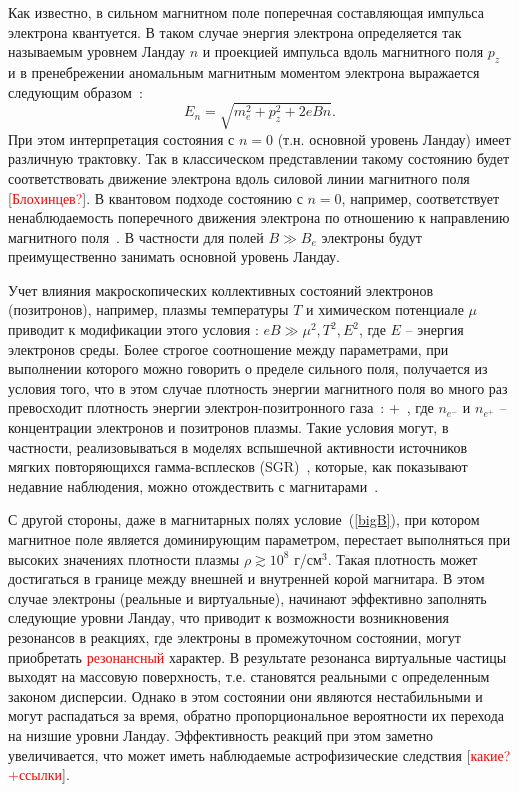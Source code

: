 Как известно, в сильном магнитном поле поперечная составляющая импульса электрона квантуется. В таком случае энергия электрона определяется так называемым уровнем Ландау $n$ и проекцией импульса вдоль магнитного поля $p_z$ и в пренебрежении аномальным магнитным моментом электрона выражается следующим образом~\cite{Sokolov:1968}: 
\begin{equation}
E_n = \sqrt{m_e^2+p_z^2+2 e B n}.
\end{equation}
%
При этом интерпретация состояния с $n=0$ (т.н. основной уровень Ландау) имеет различную трактовку. Так в классическом представлении такому состоянию будет соответствовать движение электрона вдоль силовой линии магнитного поля [\textcolor{red}{Блохинцев?}]. В квантовом подходе состоянию с $n=0$, например, соответствует ненаблюдаемость поперечного движения электрона по отношению к направлению магнитного поля~\cite{KM_Book_2013}. В частности для полей $B\gg B_e$ электроны будут преимущественно занимать основной уровень Ландау. 

Учет влияния макроскопических коллективных состояний электронов (позитронов), например, плазмы температуры $T$ и химическом потенциале $\mu$ приводит к модификации этого условия \cite{Borisov:1997}: $eB \gg \mu^2, T^2, E^2$, где $E$ -- энергия электронов среды. Более строгое соотношение между параметрами, при выполнении которого можно говорить о пределе сильного поля, получается из условия того, что в этом случае плотность энергии магнитного поля во много раз превосходит плотность энергии электрон-позитронного газа~\cite{KuzMih:2000}: 
%
\beq
\label{bigB}
 \gg {} + \,,
\eeq 
%
\noindent где $n_{e^{-}}$ и $n_{e^{+}}$ -- концентрации электронов и позитронов плазмы. Такие условия могут, в частности, реализовываться в моделях вспышечной активности источников мягких повторяющихся гамма-всплесков 
(SGR)~\cite{Duncan:1995, Bisnovatyi:1979}, которые, как показывают недавние наблюдения, можно отождествить с магнитарами~\cite{Kouveliotou:1998ze,Kouveliotou:1998fd,Gavriil:2002mc,Ibrahim:2002zw,Ibrahim:2002zy,Olausen:2014}.

С другой стороны, даже в магнитарных полях условие~(\ref{bigB}), при котором магнитное поле является доминирующим параметром, перестает выполняться при высоких значениях плотности плазмы $\rho \gtrsim 10^8$ г/см$^3$. Такая плотность может достигаться в  границе между внешней и внутренней корой магнитара. В этом случае электроны (реальные и виртуальные), начинают эффективно заполнять следующие уровни Ландау, что приводит к возможности возникновения резонансов в реакциях, где электроны в промежуточном состоянии, могут приобретать \textcolor{red}{резонансный} характер.
 В результате резонанса виртуальные частицы выходят на массовую поверхность, т.е. становятся реальными с определенным законом дисперсии. 
Однако в этом состоянии они являются нестабильными и могут распадаться за время, обратно пропорциональное вероятности их перехода на низшие уровни Ландау. Эффективность реакций при этом заметно увеличивается, что 
может иметь наблюдаемые астрофизические следствия [\textcolor{red}{какие?+ссылки}].

